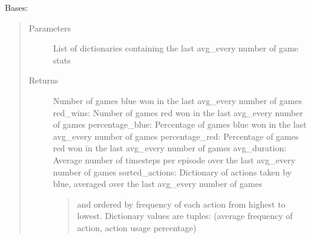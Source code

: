 \documentclass[letterpaper,10pt,english]{sphinxmanual}
\begin{document}
\begin{fulllineitems}
\label{\detokenize{source/yawning_titan.envs.generic.helpers:yawning_titan.envs.generic.helpers.eval_printout.EvalPrintout}}
\sphinxAtStartPar
Bases: 

\begin{fulllineitems}
\label{\detokenize{source/yawning_titan.envs.generic.helpers:yawning_titan.envs.generic.helpers.eval_printout.EvalPrintout.calculate_metrics}}\begin{quote}\begin{description}
\item[{Parameters}] \leavevmode
\sphinxAtStartPar
{} \textendash{} List of dictionaries containing the last avg\_every number of game stats

\item[{Returns}] \leavevmode
\sphinxAtStartPar

\sphinxAtStartPar
Number of games blue won in the last avg\_every number of games
red\_wins: Number of games red won in the last avg\_every number of games
percentage\_blue: Percentage of games blue won in the last avg\_every number of games
percentage\_red: Percentage of games red won in the last avg\_every number of games
avg\_duration: Average number of timesteps per episode over the last avg\_every number of games
sorted\_actions: Dictionary of actions taken by blue, averaged over the last avg\_every number of games
\begin{quote}

\sphinxAtStartPar
and ordered by frequency of each action from highest to lowest. Dictionary values are
tuples: (average frequency of action, action usage percentage)
\end{quote}



\end{description}
\end{quote}
\end{fulllineitems}
\end{fulllineitems}
\end{document}
